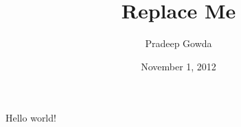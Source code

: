 \documentclass[10pt,a4paper]{article}
\begin{document}
\title {Replace Me}
\date{November 1, 2012}
\author{Pradeep Gowda}

\maketitle

Hello world!
\end{document}
